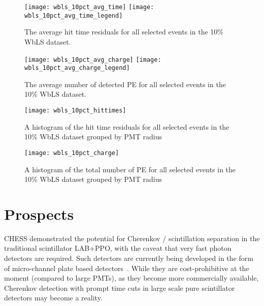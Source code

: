\begin{figure}
\centering
\texttt{[image: wbls\_10pct\_avg\_time]}
\texttt{[image: wbls\_10pct\_avg\_time\_legend]}
\caption{\label{fig:wbls10pct_avg_time}The average hit time residuals for all selected events in the 10\% WbLS dataset.}
\end{figure}

\begin{figure}
\centering
\texttt{[image: wbls\_10pct\_avg\_charge]}
\texttt{[image: wbls\_10pct\_avg\_charge\_legend]}
\caption{\label{fig:wbls10pct_avg_charge}The average number of detected PE for all selected events in the 10\% WbLS dataset.}
\end{figure}

\begin{figure}
\centering
\texttt{[image: wbls\_10pct\_hittimes]}
\caption{\label{fig:wbls10pct_tresid}A histogram of the hit time residuals for all selected events in the 10\% WbLS dataset grouped by PMT radius}
\end{figure}

\begin{figure}
\centering
\texttt{[image: wbls\_10pct\_charge]}
\caption{\label{fig:wbls10pct_totalq}A histogram of the total number of PE for all selected events in the 10\% WbLS dataset grouped by PMT radius}
\end{figure}

\section{Prospects}

CHESS demonstrated the potential for Cherenkov / scintillation separation in the traditional scintillator LAB+PPO, with the caveat that very fast photon detectors are required.
Such detectors are currently being developed in the form of micro-channel plate based detectors~\cite{lappd,lappd2}.
While they are cost-prohibitive at the moment (compared to large PMTs), as they become more commercially available, Cherenkov detection with prompt time cuts in large scale pure scintillator detectors may become a reality.

